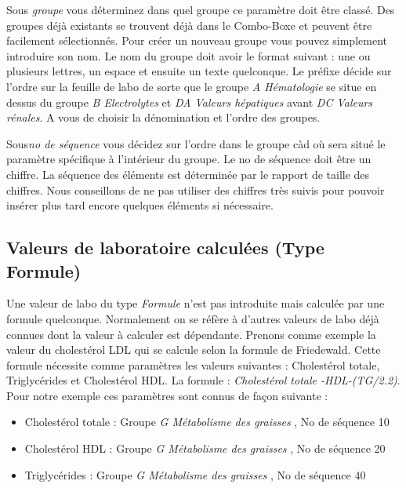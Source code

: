 Sous \textit{groupe} vous déterminez dans quel groupe ce paramètre doit être classé. Des groupes déjà existants se trouvent déjà dans le Combo-Boxe et peuvent être facilement sélectionnés. Pour créer un nouveau groupe vous pouvez simplement introduire son nom. Le nom du groupe doit avoir le format suivant : 
une ou plusieurs lettres, un espace et ensuite un texte quelconque. Le préfixe décide sur l'ordre sur la feuille de labo de sorte que le groupe \textit{A Hématologie } se situe en dessus du groupe \textit{B Electrolytes } et \textit{DA Valeurs hépatiques } avant \textit{DC Valeurs rénales}. A vous de choisir la dénomination et l'ordre des groupes.

Sous\textit{no de séquence } vous décidez sur l'ordre dans le groupe càd où sera situé le paramètre spécifique à l'intérieur du groupe. Le no de séquence doit être un chiffre. La séquence des éléments est déterminée par le rapport de taille des chiffres. Nous conseillons de ne pas utiliser des chiffres très suivis pour pouvoir insérer plus tard encore quelques éléments si nécessaire.

\subsection{Valeurs de laboratoire calculées (Type Formule)}
\label{ref:formel}
Une valeur de labo du type  \textit{Formule} n'est pas introduite mais calculée par une formule quelconque. Normalement on se réfère à d'autres valeurs de labo déjà connues dont la valeur à calculer est dépendante. Prenons comme exemple la valeur du cholestérol LDL qui se calcule selon la formule de Friedewald. Cette formule nécessite comme paramètres les valeurs suivantes : Cholestérol totale, Triglycérides et Cholestérol HDL. La formule : \textit{Cholestérol totale -HDL-(TG/2.2)}. Pour notre exemple ces paramètres sont connus de façon suivante :
\begin{itemize}
  \item Cholestérol totale : Groupe  \textit{G Métabolisme des graisses }, No de séquence 10
  \item Cholestérol HDL : Groupe \textit{G Métabolisme des graisses }, No de séquence 20
  \item Triglycérides : Groupe \textit{G Métabolisme des graisses }, No de séquence 40
\end{itemize}

